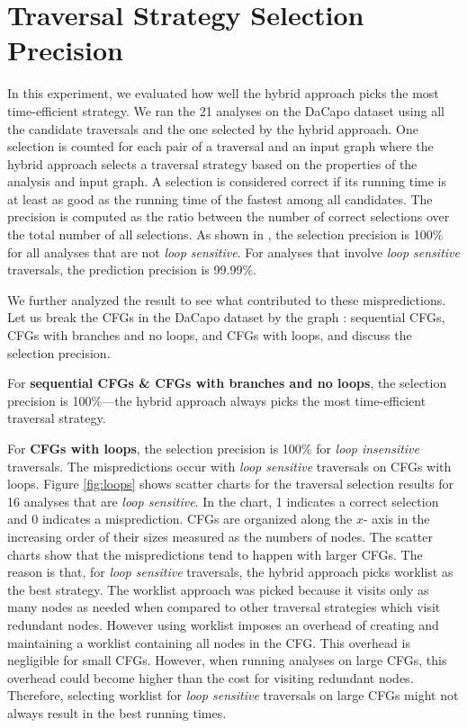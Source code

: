 \chapter{Traversal Strategy Selection Precision}
\label{sec:prediction-accuracy}





In this experiment, we evaluated how well the hybrid approach picks the most 
time-efficient strategy. We ran the 21 analyses on the DaCapo dataset using 
all the candidate traversals and the one selected by the hybrid approach. One 
selection is counted for each pair of a traversal and an input graph where 
the hybrid approach selects a traversal strategy based on the properties of 
the analysis and input graph. A selection is considered correct if its 
running time is at least as good as the running time of the fastest among all 
candidates. The precision is computed as the ratio between the number of 
correct selections over the total number of all selections. 
%
As shown in , the selection precision is 100\% 
for all analyses that are not \textit{loop sensitive}. For analyses that 
involve \textit{loop sensitive} traversals, the prediction precision is 99.99\%. 

We further analyzed the result to see what contributed to these mispredictions. 
Let us break the CFGs in the DaCapo dataset by the graph \graphprop{}: sequential CFGs, 
CFGs with branches and no loops, and CFGs with loops, and discuss the selection precision.

For \textbf{sequential CFGs \& CFGs with branches and no loops}, the selection  
precision is 100\%---the hybrid approach always picks the most time-efficient 
traversal strategy.

For \textbf{CFGs with loops}, the selection precision is 100\% for \emph{loop 
	insensitive} traversals. The mispredictions occur with \emph{loop sensitive} 
traversals on CFGs with loops. Figure \ref{fig:loops} shows scatter charts 
for the traversal selection results for 16 analyses that are \textit{loop 
	sensitive}. In the chart, 1 indicates a correct selection and 0 indicates a 
misprediction. CFGs are organized along the $x$- axis in the increasing order 
of their sizes measured as the numbers of nodes. 
%
The scatter charts show that the mispredictions tend to happen with larger 
CFGs. 
%
The reason is that, for \textit{loop sensitive} traversals, the hybrid 
approach picks worklist as the best strategy. The worklist approach was 
picked because it visits only as many nodes as needed when compared to other 
traversal strategies which visit redundant nodes. However using worklist 
imposes an overhead of creating and maintaining a worklist containing all 
nodes in the CFG. This overhead is negligible for small CFGs. However, when 
running analyses on large CFGs, this overhead could become higher 
than the cost for visiting redundant nodes. Therefore, selecting worklist for 
\emph{loop sensitive} traversals on large CFGs might not always result in the 
best running times. 

